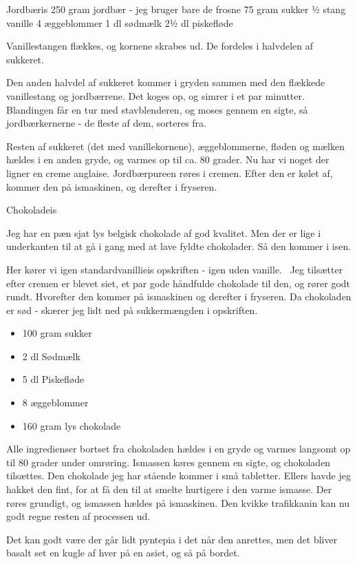 \documentclass[
  letterpaper,
  DIV=11,
  numbers=noendperiod]{scrreprt}
\providecommand{\tightlist}{%
  \setlength{\itemsep}{0pt}\setlength{\parskip}{0pt}}\usepackage{longtable,booktabs,array}
\begin{document}
Jordbæris 250 gram jordbær - jeg bruger bare de frosne 75 gram sukker ½
stang vanille 4 æggeblommer 1 dl sødmælk 2½ dl piskefløde

Vanillestangen flækkes, og kornene skrabes ud. De fordeles i halvdelen
af sukkeret.

Den anden halvdel af sukkeret kommer i gryden sammen med den flækkede
vanillestang og jordbærrene. Det koges op, og simrer i et par minutter.
Blandingen får en tur med stavblenderen, og moses gennem en sigte, så
jordbærkernerne - de fleste af dem, sorteres fra.

Resten af sukkeret (det med vanillekornene), æggeblommerne, fløden og
mælken hældes i en anden gryde, og varmes op til ca. 80 grader. Nu har
vi noget der ligner en creme anglaise. Jordbærpureen røres i cremen.
Efter den er kølet af, kommer den på ismaskinen, og derefter i fryseren.

Chokoladeis

Jeg har en pæn sjat lys belgisk chokolade af god kvalitet. Men der er
lige i underkanten til at gå i gang med at lave fyldte chokolader. Så
den kommer i isen.

Her kører vi igen standardvanillieis opskriften - igen uden vanille.~
Jeg tilsætter efter cremen er blevet siet, et par gode håndfulde
chokolade til den, og rører godt rundt. Hvorefter den kommer på
ismaskinen og derefter i fryseren. Da chokoladen er sød - skærer jeg
lidt ned på sukkermængden i opskriften.

\begin{itemize}
\tightlist
\item
  100 gram sukker
\item
  2 dl Sødmælk
\item
  5 dl Piskefløde
\item
  8 æggeblommer
\item
  160 gram lys chokolade
\end{itemize}

Alle ingredienser bortset fra chokoladen hældes i en gryde og varmes
langsomt op til 80 grader under omrøring. Ismassen køres gennem en
sigte, og chokoladen tilsættes. Den chokolade jeg har stående kommer i
små tabletter. Ellers havde jeg hakket den fint, for at få den til at
smelte hurtigere i den varme ismasse. Der røres grundigt, og ismassen
hældes på ismaskinen. Den kvikke trafikkanin kan nu godt regne resten af
processen ud.

Det kan godt være der går lidt pyntepia i det når den anrettes, men det
bliver basalt set en kugle af hver på en asiet, og så på bordet.
\end{document}
